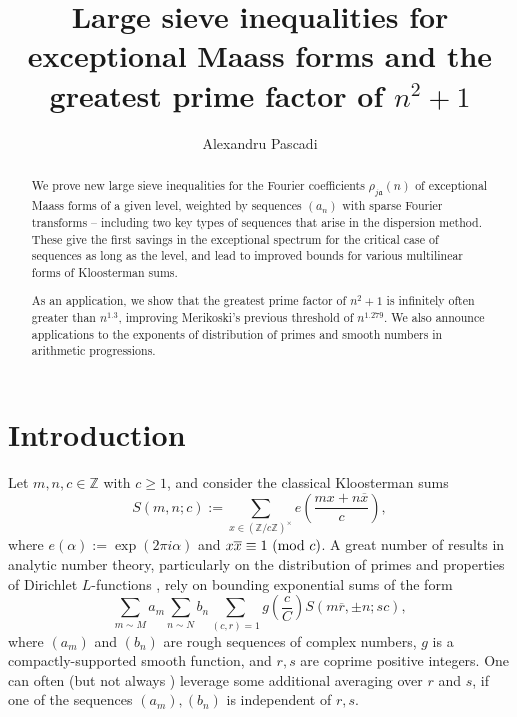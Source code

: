 \documentclass[reqno,11pt]{amsart}
\title[Large sieve for exceptional Maass forms and the greatest prime factor of $n^2+1$]{Large sieve inequalities for exceptional Maass forms and the greatest prime factor of $n^2+1$}
\author[Alexandru Pascadi]{Alexandru Pascadi}
\theoremstyle{remark}
\numberwithin{equation}{section}
\newcommand{\Z}{\mathbb{Z}}
\renewcommand{\bar}{\overline}
\renewcommand{\pmod}[1]{\ (\textnormal{mod } #1)}
\begin{document}
\begin{abstract}
    We prove new large sieve inequalities for the Fourier coefficients $\rho_{j\mathfrak{a}}(n)$ of exceptional Maass forms of a given level, weighted by sequences $(a_n)$ with sparse Fourier transforms -- including two key types of sequences that arise in the dispersion method. These give the first savings in the exceptional spectrum for the critical case of sequences as long as the level, and lead to improved bounds for various multilinear forms of Kloosterman sums.

    As an application, we show that the greatest prime factor of $n^2+1$ is infinitely often greater than $n^{1.3}$, improving Merikoski's previous threshold of $n^{1.279}$. We also announce applications to the exponents of distribution of primes and smooth numbers in arithmetic progressions.
\end{abstract}

\maketitle

\vspace{-0.7cm}
{
\setlength{\parskip}{0em}
\setcounter{tocdepth}{1}
\tableofcontents
}
\vspace{-1cm}

\section{Introduction} \label{sec:intro}

Let $m, n, c \in \Z$ with $c \ge 1$, and consider the classical Kloosterman sums
\begin{equation} \label{eq:kloosterman}
    S(m, n; c) := \sum_{x \in (\Z/c\Z)^\times} e\left(\frac{mx + n\bar{x}}{c}\right),
\end{equation}
where $e(\alpha) := \exp(2\pi i \alpha)$ and $x\bar{x} \equiv 1 \pmod{c}$. A great number of results in analytic number theory, particularly on the distribution of primes \cite{bombieri1986primes,maynard2020primes,maynard2020primesII,maynard2020primesIII,deshouillers1982greatest,de2020niveau,merikoski2023largest,lichtman2023primes} and properties of Dirichlet $L$-functions \cite{deshouillers1982power,deshouillers1984power,watt1995kloosterman,young2011fourth,drappeau2023one,topacogullari2018shifted}, rely on bounding exponential sums of the form
\begin{equation} \label{eq:sum-of-kloosterman}
    \sum_{m \sim M} a_m \sum_{n \sim N} b_n
    \sum_{(c, r) = 1} g\left(\frac{c}{C}\right) S(m\bar{r}, \pm n; sc),
\end{equation}
where $(a_m)$ and $(b_n)$ are rough sequences of complex numbers, $g$ is a compactly-supported smooth function, and $r, s$ are coprime positive integers. One can often (but not always \cite{merikoski2023largest,de2020niveau,maynard2020primes}) leverage some additional averaging over $r$ and $s$, if one of the sequences $(a_m), (b_n)$ is independent of $r, s$.
\end{document}
